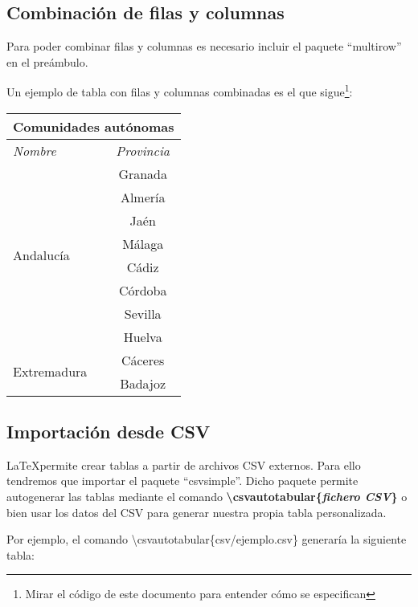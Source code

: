 \subsection{Combinación de filas y columnas}

Para poder combinar filas y columnas es necesario incluir el paquete ``multirow'' en el preámbulo.

Un ejemplo de tabla con filas y columnas combinadas es el que sigue\footnote{Mirar el código de este documento para entender cómo se especifican}:

\begin{tabular}{ |l||c|  }
 \hline
 \multicolumn{2}{|c|}{\textbf{Comunidades autónomas}} \\
 \hline
  \emph{Nombre} & \emph{Provincia}\\
 \hline
 \multirow{8}{*}{Andalucía} & Granada\\
 \cline{2 - 2} %
 	& Almería\\
 \cline{2 - 2}
 	& Jaén\\
 \cline{2 - 2}
 	& Málaga\\
 \cline{2 - 2}
 	& Cádiz\\
 \cline{2 - 2}
 	& Córdoba\\
 \cline{2 - 2}
 	& Sevilla\\
 \cline{2 - 2}
 	& Huelva\\
 \hline
 \multirow{2}{*}{Extremadura} & Cáceres\\
 \cline{2 - 2} %
 	& Badajoz\\
 \hline
\end{tabular}

\subsection{Importación desde CSV}

\LaTeX permite crear tablas a partir de archivos CSV externos. Para ello tendremos que importar el paquete ``csvsimple''. Dicho paquete permite autogenerar las tablas mediante el comando \textbf{\textbackslash csvautotabular\{\emph{fichero CSV}\}} o bien usar los datos del CSV para generar nuestra propia tabla personalizada.

Por ejemplo, el comando \textbackslash csvautotabular\{csv/ejemplo.csv\} generaría la siguiente tabla:

